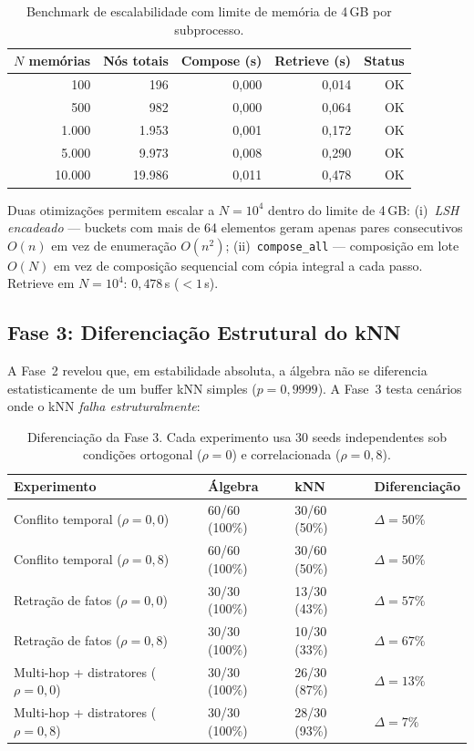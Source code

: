 \documentclass[11pt,a4paper]{article}
\theoremstyle{definition}
\begin{document}
\begin{table}[h]
\centering
\begin{tabular}{rrrrr}
\toprule
$N$ mem\'orias & N\'os totais & Compose (s) & Retrieve (s) & Status \\
\midrule
100 & 196 & 0,000 & 0,014 & OK \\
500 & 982 & 0,000 & 0,064 & OK \\
1.000 & 1.953 & 0,001 & 0,172 & OK \\
5.000 & 9.973 & 0,008 & 0,290 & OK \\
10.000 & 19.986 & 0,011 & 0,478 & OK \\
\bottomrule
\end{tabular}
\caption{Benchmark de escalabilidade com limite de mem\'oria de 4\,GB por subprocesso.}
\end{table}

Duas otimiza\c{c}\~oes permitem escalar a $N = 10^4$ dentro do limite de 4\,GB: (i)~\emph{LSH encadeado} --- buckets com mais de 64 elementos geram apenas pares consecutivos $O(n)$ em vez de enumera\c{c}\~ao $O(n^2)$; (ii)~\texttt{compose\_all} --- composi\c{c}\~ao em lote $O(N)$ em vez de composi\c{c}\~ao sequencial com c\'opia integral a cada passo. Retrieve em $N = 10^4$: $0{,}478$\,s ($< 1$\,s).

\subsection{Fase 3: Diferencia\c{c}\~ao Estrutural do kNN}

A Fase~2 revelou que, em estabilidade absoluta, a \'algebra n\~ao se diferencia estatisticamente de um buffer kNN simples ($p = 0{,}9999$). A Fase~3 testa cen\'arios onde o kNN \emph{falha estruturalmente}:

\begin{table}[h]
\centering
\begin{tabular}{llll}
\toprule
\textbf{Experimento} & \textbf{\'Algebra} & \textbf{kNN} & \textbf{Diferencia\c{c}\~ao} \\
\midrule
Conflito temporal ($\rho=0{,}0$) & 60/60 (100\%) & 30/60 (50\%) & $\Delta = 50\%$ \\
Conflito temporal ($\rho=0{,}8$) & 60/60 (100\%) & 30/60 (50\%) & $\Delta = 50\%$ \\
Retra\c{c}\~ao de fatos ($\rho=0{,}0$) & 30/30 (100\%) & 13/30 (43\%) & $\Delta = 57\%$ \\
Retra\c{c}\~ao de fatos ($\rho=0{,}8$) & 30/30 (100\%) & 10/30 (33\%) & $\Delta = 67\%$ \\
Multi-hop + distratores ($\rho=0{,}0$) & 30/30 (100\%) & 26/30 (87\%) & $\Delta = 13\%$ \\
Multi-hop + distratores ($\rho=0{,}8$) & 30/30 (100\%) & 28/30 (93\%) & $\Delta = 7\%$ \\
\bottomrule
\end{tabular}
\caption{Diferencia\c{c}\~ao da Fase 3. Cada experimento usa 30 seeds independentes sob condi\c{c}\~oes ortogonal ($\rho=0$) e correlacionada ($\rho=0{,}8$).}
\end{table}
\end{document}

